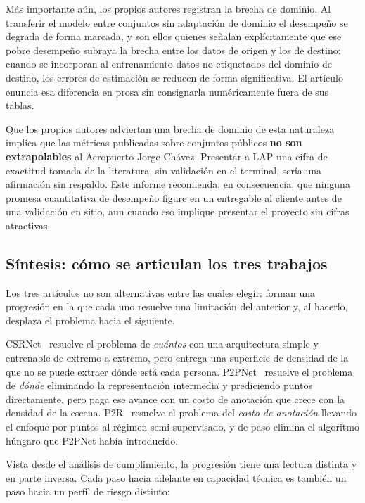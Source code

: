 Más importante aún, los propios autores registran la brecha de dominio.
Al transferir el modelo entre conjuntos sin adaptación de dominio el
desempeño se degrada de forma marcada, y son ellos quienes señalan
explícitamente que ese pobre desempeño subraya la brecha entre los datos
de origen y los de destino; cuando se incorporan al entrenamiento datos
no etiquetados del dominio de destino, los errores de estimación se
reducen de forma significativa. El artículo enuncia esa diferencia en
prosa sin consignarla numéricamente fuera de sus tablas.

Que los propios autores
adviertan una brecha de dominio de esta naturaleza implica que las
métricas publicadas sobre conjuntos públicos \textbf{no son
extrapolables} al Aeropuerto Jorge Chávez. Presentar a LAP una cifra de
exactitud tomada de la literatura, sin validación en el terminal, sería
una afirmación sin respaldo. Este informe recomienda, en consecuencia, que ninguna promesa cuantitativa de desempeño figure en un
entregable al cliente antes de una validación en sitio, aun cuando eso
implique presentar el proyecto sin cifras atractivas.

\subsection{Síntesis: cómo se articulan los tres trabajos}
\label{sec:sintesis-antecedentes}

Los tres artículos no son alternativas entre las cuales elegir: forman
una progresión en la que cada uno resuelve una limitación del anterior y,
al hacerlo, desplaza el problema hacia el siguiente.

CSRNet~\cite{Li_2018_CVPR} resuelve el problema de \emph{cuántos} con una
arquitectura simple y entrenable de extremo a extremo, pero entrega una
superficie de densidad de la que no se puede extraer dónde está cada
persona. P2PNet~\cite{Song_2021_ICCV} resuelve el problema de
\emph{dónde} eliminando la representación intermedia y prediciendo puntos
directamente, pero paga ese avance con un costo de anotación que crece
con la densidad de la escena. P2R~\cite{Lin_2025_CVPR} resuelve el
problema del \emph{costo de anotación} llevando el enfoque por puntos al
régimen semi-supervisado, y de paso elimina el algoritmo húngaro que
P2PNet había introducido.

Vista desde el análisis de cumplimiento, la progresión tiene una lectura
distinta y en parte inversa. Cada paso hacia adelante en capacidad
técnica es también un paso hacia un perfil de riesgo distinto:

